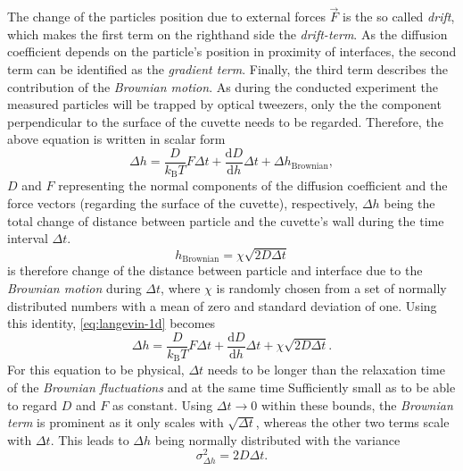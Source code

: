 \documentclass[.../bericht]{subfilies}
\begin{document}
          The change of the particles position due to external forces $\vec{F}$ is the so called \textit{drift}, which makes the first term on the righthand side the \textit{drift-term}. As the diffusion coefficient depends on the particle's position in proximity of interfaces, the second term can be identified as the \textit{gradient term}. Finally, the third term describes the contribution of the \textit{Brownian motion}. As during the conducted experiment the measured particles will be trapped by optical tweezers, only the the component perpendicular to the surface of the cuvette needs to be regarded. Therefore, the above equation is written in scalar form
          \begin{equation}
            \Delta h = \frac{D}{k_\mathrm{B}T}F \Delta t + \frac{\mathrm{d}D}{\mathrm{d}h}\Delta t + \Delta h_\mathrm{Brownian},
            \label{eq:langevin-1d}
          \end{equation}
          $D$ and $F$ representing the normal components of the diffusion coefficient and the force vectors (regarding the surface of the cuvette), respectively, $\Delta h$ being the total change of distance between particle and the cuvette's wall during the time interval $\Delta t$.
          \begin{equation*}
            h_\mathrm{Brownian}=\chi \sqrt{2D\Delta t}
          \end{equation*}
           is therefore change of the distance between particle and interface due to the \textit{Brownian motion} during $\Delta t$, where $\chi$ is randomly chosen from a set of normally distributed numbers with a mean of zero and standard deviation of one. Using this identity, \cref{eq:langevin-1d} becomes
           \begin{equation*}
             \Delta h = \frac{D}{k_\mathrm{B}T}F\Delta t + \frac{\mathrm{d}D}{\mathrm{d}h}\Delta t + \chi \sqrt{2D\Delta t}.
           \end{equation*}
           For this equation to be physical, $\Delta t$ needs to be longer than the relaxation time of the \textit{Brownian fluctuations} and at the same time Sufficiently small as to be able to regard $D$ and $F$ as constant. Using $\Delta t \rightarrow 0 $ within these bounds, the \textit{Brownian term} is prominent as it only scales with $\sqrt{\Delta t}$, whereas the other two terms scale with $\Delta t$. This leads to $\Delta h$ being normally distributed with the variance
           \begin{equation}
             \sigma_{\Delta h}^2=2D\Delta t.
             \label{eq:variance-simple}
           \end{equation}
\end{document}
